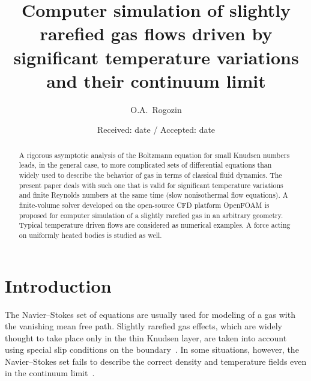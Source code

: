 \documentclass[smallextended, final]{svjour3} %
\begin{document}
\title{
    Computer simulation of slightly rarefied gas flows driven by significant temperature variations and their continuum limit
}

\author{O.A.~Rogozin}

\date{Received: date / Accepted: date}

\maketitle

\begin{abstract}
    A rigorous asymptotic analysis of the Boltzmann equation for small Knudsen numbers
    leads, in the general case, to more complicated sets of differential equations
    than widely used to describe the behavior of gas in terms of classical fluid dynamics.
    The present paper deals with such one that is valid for significant temperature variations
    and finite Reynolds numbers at the same time (slow nonisothermal flow equations).
    A finite-volume solver developed on the open-source CFD platform OpenFOAM\textregistered{}
    is proposed for computer simulation of a slightly rarefied gas in an arbitrary geometry.
    Typical temperature driven flows are considered as numerical examples.
    A force acting on uniformly heated bodies is studied as well.
\end{abstract}

\section{Introduction}

The Navier--Stokes set of equations are usually used for modeling of a gas with the vanishing mean free path.
Slightly rarefied gas effects, which are widely thought to take place only in the thin Knudsen layer,
are taken into account using special slip conditions on the boundary~\cite{SharipovCoefficients}.
In some situations, however, the Navier--Stokes set fails to describe the correct density
and temperature fields even in the continuum limit~\cite{Kogan1976}.
\end{document}
